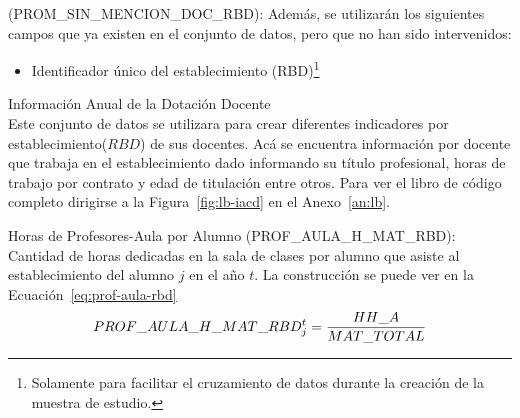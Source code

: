 \begin{longdescription}
\begin{longdescription}
                (PROM\_SIN\_MENCION\_DOC\_RBD):
                Además, se utilizarán los siguientes campos que ya existen en el conjunto de datos, pero que no han sido intervenidos:
                \begin{itemize}
                  \item Identificador único del establecimiento (RBD)\footnote{Solamente para facilitar el cruzamiento de datos durante la creación de la muestra de estudio.}
                \end{itemize}
        \end{longdescription}
        \item[Información Anual de la Dotación Docente] \hfill \\
        Este conjunto de datos se utilizara para crear diferentes indicadores por establecimiento($RBD$) de sus docentes.
        Acá se encuentra información por docente que trabaja en el establecimiento dado informando su título profesional, horas de trabajo por contrato y edad de titulación entre otros. Para ver el libro de código completo dirigirse a la Figura~\ref{fig:lb-iacd} en el Anexo~\ref{an:lb}.
            \begin{longdescription}
                \item[Horas de Profesores-Aula por Alumno](PROF\_AULA\_H\_MAT\_RBD): Cantidad de horas dedicadas en la sala de clases por alumno que asiste al establecimiento del alumno $j$ en el año $t$.
                La construcción se puede ver en la Ecuación~\ref{eq:prof-aula-rbd}
                  \begin{equation}
                  \centering
                    PROF\_AULA\_H\_MAT\_RBD_{j}^{t} = \frac{HH\_A}{MAT\_TOTAL}
                    \label{eq:prof-aula-rbd}
                  \end{equation}
                

\end{longdescription}
\end{longdescription}
